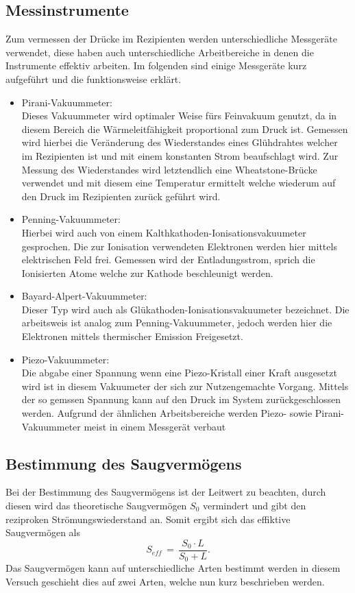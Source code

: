 \subsection{Messinstrumente}
Zum vermessen der Drücke im Rezipienten werden unterschiedliche Messgeräte verwendet, diese haben auch unterschiedliche Arbeitbereiche 
in denen die Instrumente effektiv arbeiten. Im folgenden sind einige Messgeräte kurz aufgeführt und die funktionsweise erklärt.
\begin{itemize}
 \item Pirani-Vakuummeter:\\
 Dieses Vakuummeter wird optimaler Weise fürs Feinvakuum genutzt, da in diesem Bereich die Wärmeleitfähigkeit proportional zum Druck ist.
Gemessen wird hierbei die Veränderung des Wiederstandes eines Glühdrahtes welcher im Rezipienten ist und mit einem konstanten Strom beaufschlagt 
wird. Zur Messung des Wiederstandes wird letztendlich eine Wheatstone-Brücke verwendet und mit diesem eine Temperatur ermittelt welche wiederum 
auf den Druck im Rezipienten zurück geführt wird.
 \item Penning-Vakuummeter:\\
 Hierbei wird auch von einem Kalthkathoden-Ionisationsvakuumeter gesprochen. Die zur Ionisation verwendeten Elektronen werden hier mittels 
 elektrischen Feld frei. Gemessen wird der Entladungsstrom, sprich die Ionisierten Atome welche zur Kathode beschleunigt werden.
 \item Bayard-Alpert-Vakuummeter:\\
 Dieser Typ wird auch als Glükathoden-Ionisationsvakuumeter bezeichnet.
 Die arbeitsweis ist analog zum Penning-Vakuummeter, jedoch werden hier die Elektronen mittels thermischer Emission Freigesetzt.
 \item Piezo-Vakuummeter:\\
 Die abgabe einer Spannung wenn eine Piezo-Kristall einer Kraft ausgesetzt wird ist in diesem Vakuumeter der sich zur Nutzengemachte 
 Vorgang. Mittels der so gemssen Spannung kann auf den Druck im System zurückgeschlossen werden. Aufgrund der ähnlichen Arbeitsbereiche werden Piezo- sowie Pirani-Vakuummeter meist in einem Messgerät verbaut 
\end{itemize}

\subsection{Bestimmung des Saugvermögens}
Bei der Bestimmung des Saugvermögens ist der Leitwert zu beachten, durch diesen wird das theoretische Saugvermögen $S_0$
vermindert und gibt den reziproken Strömungswiederstand an. Somit ergibt sich das effiktive Saugvermögen als 
\begin {equation}
 S_{eff}\,=\, \frac{S_0\cdot L}{S_0+L}.
\label{eqn:effsaug}
\end{equation}
Das Saugvermögen kann auf unterschiedliche Arten bestimmt werden in diesem Versuch geschieht dies auf zwei Arten, welche nun 
kurz beschrieben werden.
